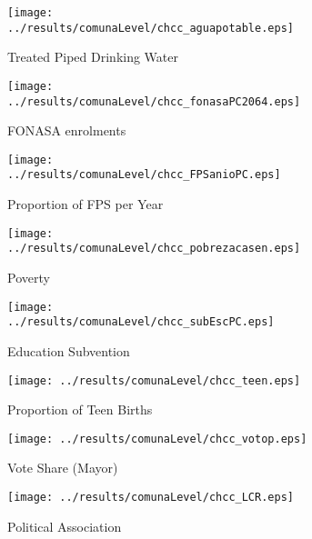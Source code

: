 \documentclass[12pt]{article}
\begin{document}
\begin{spacing}{1.4}
\begin{landscape}
\begin{figure}[htpb!]
  \begin{center}
    \caption{Municipal Characteristics and ChCC Enrolment}
    \label{ChCCenrol}
    \begin{subfigure}{.33\textwidth}
      \centering
      \texttt{[image: ../results/comunaLevel/chcc\_aguapotable.eps]}
      \caption{Treated Piped Drinking Water}
      \label{agua}
    \end{subfigure}%
    \begin{subfigure}{.33\textwidth}
      \centering
      \texttt{[image: ../results/comunaLevel/chcc\_fonasaPC2064.eps]}
      \caption{FONASA enrolments}
      \label{fonasa}
    \end{subfigure}%
    \begin{subfigure}{.33\textwidth}
      \centering
      \texttt{[image: ../results/comunaLevel/chcc\_FPSanioPC.eps]}
      \caption{Proportion of FPS per Year}
      \label{FPS}
    \end{subfigure}
    \begin{subfigure}{.33\textwidth}
      \centering
      \texttt{[image: ../results/comunaLevel/chcc\_pobrezacasen.eps]}
      \caption{Poverty}
      \label{pobreza}
    \end{subfigure}%
    \begin{subfigure}{.33\textwidth}
      \centering
      \texttt{[image: ../results/comunaLevel/chcc\_subEscPC.eps]}
      \caption{Education Subvention}
      \label{subEsc}
    \end{subfigure}%
    \begin{subfigure}{.33\textwidth}
      \centering
      \texttt{[image: ../results/comunaLevel/chcc\_teen.eps]}
      \caption{Proportion of Teen Births}
      \label{teen}
    \end{subfigure}
    \begin{subfigure}{.33\textwidth}
      \centering
      \texttt{[image: ../results/comunaLevel/chcc\_votop.eps]}
      \caption{Vote Share (Mayor)}
      \label{votop}
    \end{subfigure}%
    \begin{subfigure}{.33\textwidth}
      \centering
      \texttt{[image: ../results/comunaLevel/chcc\_LCR.eps]}
      \caption{Political Association}
      \label{LCR}
    \end{subfigure}%
    \begin{subfigure}{.33\textwidth}

\end{subfigure}
\end{center}
\end{figure}
\end{landscape}
\end{spacing}
\end{document}
